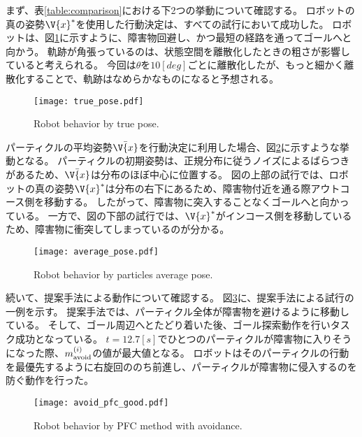 まず、表\ref{table:comparison}における下2つの挙動について確認する。
ロボットの真の姿勢$\V{x}^{*}$を使用した行動決定は、すべての試行において成功した。
ロボットは、図\ref{fig:true pose}に示すように、障害物回避し、かつ最短の経路を通ってゴールへと向かう。
軌跡が角張っているのは、状態空間を離散化したときの粗さが影響していると考えられる。
今回は$\theta$を$10[\si{deg}]$ごとに離散化したが、もっと細かく離散化することで、軌跡はなめらかなものになると予想される。

\begin{figure}[tbp]
  \begin{center}
    \texttt{[image: true\_pose.pdf]}
    \caption{Robot behavior by true pose.}
    \label{fig:true pose}
  \end{center}
\end{figure}

パーティクルの平均姿勢$\bar{\V{x}}$を行動決定に利用した場合、図\ref{fig:average pose}に示すような挙動となる。
パーティクルの初期姿勢は、正規分布に従うノイズによるばらつきがあるため、$\bar{\V{x}}$は分布のほぼ中心に位置する。
図の上部の試行では、ロボットの真の姿勢$\V{x}^{*}$は分布の右下にあるため、障害物付近を通る際アウトコース側を移動する。
したがって、障害物に突入することなくゴールへと向かっている。
一方で、図の下部の試行では、$\V{x}^{*}$がインコース側を移動しているため、障害物に衝突してしまっているのが分かる。

\begin{figure}[tbp]
  \begin{center}
    \texttt{[image: average\_pose.pdf]}
    \caption{Robot behavior by particles average pose.}
    \label{fig:average pose}
  \end{center}
\end{figure}

続いて、提案手法による動作について確認する。
図\ref{fig:avoid pfc good}に、提案手法による試行の一例を示す。
提案手法では、パーティクル全体が障害物を避けるように移動している。
そして、ゴール周辺へとたどり着いた後、ゴール探索動作を行いタスク成功となっている。
$t=12.7[\si{s}]$でひとつのパーティクルが障害物に入りそうになった際、$m^{(i)}_{\rm avoid}$の値が最大値となる。
ロボットはそのパーティクルの行動を最優先するように右旋回ののち前進し、パーティクルが障害物に侵入するのを防ぐ動作を行った。

\begin{figure}[tbp]
  \begin{center}
    \texttt{[image: avoid\_pfc\_good.pdf]}
    \caption{Robot behavior by PFC method with avoidance.}
    \label{fig:avoid pfc good}
  \end{center}
\end{figure}

